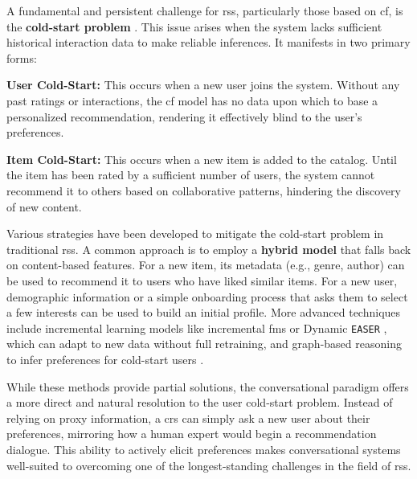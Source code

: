 A fundamental and persistent challenge for \aclp{rs}, particularly those based on \acl{cf}, is the \textbf{cold-start problem} \cite{SOTA-COLD-START}. This issue arises when the system lacks sufficient historical interaction data to make reliable inferences. It manifests in two primary forms:

\begin{compactitem}[\textbullet]
    \item \textbf{User Cold-Start:} This occurs when a new user joins the system. Without any past ratings or interactions, the \acs{cf} model has no data upon which to base a personalized recommendation, rendering it effectively blind to the user's preferences.
    \item \textbf{Item Cold-Start:} This occurs when a new item is added to the catalog. Until the item has been rated by a sufficient number of users, the system cannot recommend it to others based on collaborative patterns, hindering the discovery of new content.
\end{compactitem}

Various strategies have been developed to mitigate the cold-start problem in traditional \acp{rs}. A common approach is to employ a \textbf{hybrid model} that falls back on content-based features. For a new item, its metadata (e.g., genre, author) can be used to recommend it to users who have liked similar items. For a new user, demographic information or a simple onboarding process that asks them to select a few interests can be used to build an initial profile. More advanced techniques include incremental learning models like incremental \acp{fm} \cite{COLD-START-INCREMENTAL-FM} or Dynamic \texttt{EASER} \cite{COLD-START-DYN-EASER}, which can adapt to new data without full retraining, and graph-based reasoning to infer preferences for cold-start users \cite{SOTA-GRAPH-REASONING-COLD-START}.

While these methods provide partial solutions, the conversational paradigm offers a more direct and natural resolution to the user cold-start problem. Instead of relying on proxy information, a \ac{crs} can simply ask a new user about their preferences, mirroring how a human expert would begin a recommendation dialogue. This ability to actively elicit preferences makes conversational systems well-suited to overcoming one of the longest-standing challenges in the field of \aclp{rs}.